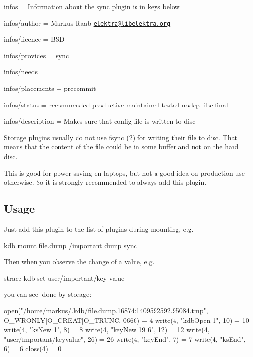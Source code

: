 
\begin{DoxyItemize}
\item infos = Information about the sync plugin is in keys below
\item infos/author = Markus Raab \href{mailto:elektra@libelektra.org}{\tt elektra@libelektra.\+org}
\item infos/licence = B\+SD
\item infos/provides = sync
\item infos/needs =
\item infos/placements = precommit
\item infos/status = recommended productive maintained tested nodep libc final
\item infos/description = Makes sure that config file is written to disc
\end{DoxyItemize}

Storage plugins usually do not use fsync (2) for writing their file to disc. That means that the content of the file could be in some buffer and not on the hard disc.

This is good for power saving on laptops, but not a good idea on production use otherwise. So it is strongly recommended to always add this plugin.

\subsection*{Usage}

Just add this plugin to the list of plugins during mounting, e.\+g. \begin{DoxyVerb}kdb mount file.dump /important dump sync
\end{DoxyVerb}


Then when you observe the change of a value, e.\+g. \begin{DoxyVerb}strace kdb set user/important/key value
\end{DoxyVerb}


you can see, done by storage\+: \begin{DoxyVerb}open("/home/markus/.kdb/file.dump.16874:1409592592.95084.tmp",
        O_WRONLY|O_CREAT|O_TRUNC, 0666) = 4
write(4, "kdbOpen 1\n", 10)             = 10
write(4, "ksNew 1\n", 8)                = 8
write(4, "keyNew 19 6\n", 12)           = 12
write(4, "user/important/key\0value\0\n", 26) = 26
write(4, "keyEnd\n", 7)                 = 7
write(4, "ksEnd\n", 6)                  = 6
close(4)                                = 0
\end{DoxyVerb}


